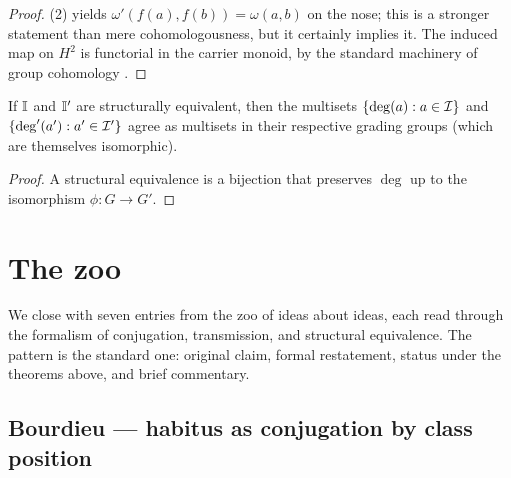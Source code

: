 \begin{proof}
(2) yields $\omega'(f(a),f(b)) = \omega(a,b)$
on the nose; this is a stronger statement than mere cohomologousness,
but it certainly implies it. The induced map on $H^2$ is functorial in
the carrier monoid, by the standard machinery of group cohomology
\cite{Weibel1994,Brown1982}.
\end{proof}

\begin{corollary}
\label{cor:deg-invariant}
If $\mathbb{I}$ and $\mathbb{I}'$ are structurally equivalent, then the
multisets $\{\deg(a) : a\in\mathcal{I}\}$ and $\{\deg'(a') : a'\in\mathcal{I}'\}$
agree as multisets in their respective grading groups (which are
themselves isomorphic).
\end{corollary}

\begin{proof}
A structural equivalence is a bijection that preserves $\deg$ up to
the isomorphism $\phi\colon G\to G'$.
\end{proof}

\section{The zoo}\label{sec:zoo-ch6}

We close with seven entries from the zoo of ideas about ideas, each
read through the formalism of conjugation, transmission, and
structural equivalence. The pattern is the standard one:
original claim, formal restatement, status under the theorems above,
and brief commentary.

\subsection{Bourdieu --- habitus as conjugation by class position}
\label{zoo:bourdieu}

